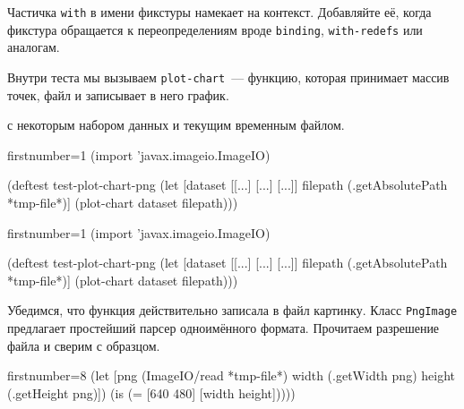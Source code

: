 \fi

Частичка \verb|with| в имени фикстуры намекает на контекст. Добавляйте её, когда
фикстура обращается к переопределениям вроде \verb|binding|, \verb|with-redefs|
или аналогам.


Внутри теста мы вызываем \verb|plot-chart|~--- функцию, которая принимает массив
точек, файл и записывает в него график.



 с некоторым набором данных и текущим
временным файлом.

\ifnarrow

\begin{english}
  \begin{clojure/lines*}{firstnumber=1}
(import 'javax.imageio.ImageIO)

(deftest test-plot-chart-png
 (let [dataset [[...] [...] [...]]
       filepath (.getAbsolutePath
                          *tmp-file*)]
   (plot-chart dataset filepath)))
  \end{clojure/lines*}
\end{english}

\else

\begin{english}
  \begin{clojure/lines*}{firstnumber=1}
(import 'javax.imageio.ImageIO)

(deftest test-plot-chart-png
  (let [dataset [[...] [...] [...]]
        filepath (.getAbsolutePath *tmp-file*)]
    (plot-chart dataset filepath)))
  \end{clojure/lines*}
\end{english}

\fi

\wavebottom

\noindent
Убедимся, что функция действительно записала в файл картинку. Класс
\verb|PngImage| предлагает простейший парсер одноимённого формата. Прочитаем
разрешение файла и сверим с образцом.

\wavetop

\ifnarrow

\begin{english}
  \begin{clojure/lines*}{firstnumber=8}
(let [png (ImageIO/read *tmp-file*)
      width (.getWidth png)
      height (.getHeight png)])
(is (= [640 480] [width height]))))
  \end{clojure/lines*}
\end{english}

